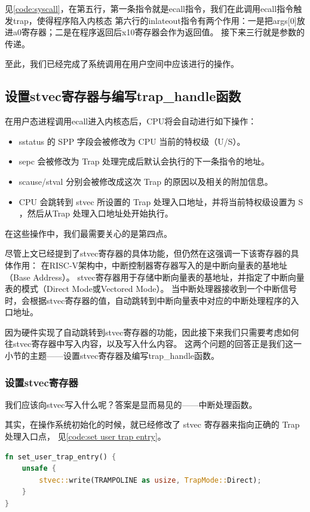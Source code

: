 见\autoref{code:syscall}，在第五行，第一条指令就是ecall指令，我们在此调用ecall指令触发trap，使得程序陷入内核态
第六行的inlateout指令有两个作用：一是把args[0]放进a0寄存器；二是在程序返回后x10寄存器会作为返回值。
接下来三行就是参数的传递。

至此，我们已经完成了系统调用在用户空间中应该进行的操作。

\subsection{设置stvec寄存器与编写trap_handle函数}

在用户态进程调用ecall进入内核态后，CPU将会自动进行如下操作：

\begin{itemize}
    \item sstatus 的 SPP 字段会被修改为 CPU 当前的特权级（U/S）。
    \item sepc 会被修改为 Trap 处理完成后默认会执行的下一条指令的地址。
    \item scause/stval 分别会被修改成这次 Trap 的原因以及相关的附加信息。
    \item CPU 会跳转到 stvec 所设置的 Trap 处理入口地址，并将当前特权级设置为 S ，然后从Trap 处理入口地址处开始执行。
\end{itemize}

在这些操作中，我们最需要关心的是第四点。

尽管上文已经提到了stvec寄存器的具体功能，但仍然在这强调一下该寄存器的具体作用：
在RISC-V架构中，中断控制器寄存器写入的是中断向量表的基地址（Base Address）。
stvec寄存器用于存储中断向量表的基地址，并指定了中断向量表的模式（Direct Mode或Vectored Mode）。
当中断处理器接收到一个中断信号时，会根据stvec寄存器的值，自动跳转到中断向量表中对应的中断处理程序的入口地址。

因为硬件实现了自动跳转到stvec寄存器的功能，因此接下来我们只需要考虑如何往stvec寄存器中写入内容，以及写入什么内容。
这两个问题的回答正是我们这一小节的主题——设置stvec寄存器及编写trap_handle函数。

\subsubsection{设置stvec寄存器}

我们应该向stvec写入什么呢？答案是显而易见的——中断处理函数。

其实，在操作系统初始化的时候，就已经修改了 stvec 寄存器来指向正确的 Trap 处理入口点，
见\autoref{code:set user trap entry}。

\begin{lstlisting}[language={Rust}, label={code:set user trap entry},
    caption={set_user_trap_entry}]
fn set_user_trap_entry() {
    unsafe {
        stvec::write(TRAMPOLINE as usize, TrapMode::Direct);
    }
}
\end{lstlisting}


